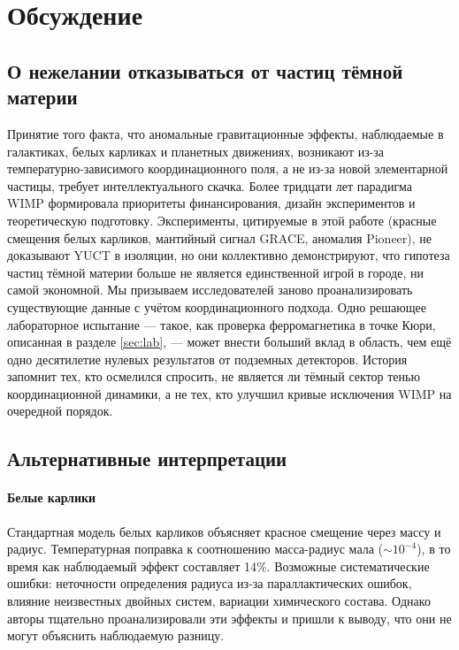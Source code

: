\documentclass[12pt]{article}
\theoremstyle{remark}
\begin{document}
	\section{Обсуждение}
	\label{sec:discussion}
	
	\subsection{О нежелании отказываться от частиц тёмной материи}
	\label{subsec:on-reluctance}
	
	Принятие того факта, что аномальные гравитационные эффекты, наблюдаемые в галактиках, белых карликах и планетных движениях, возникают из-за температурно-зависимого координационного поля, а не из-за новой элементарной частицы, требует интеллектуального скачка. Более тридцати лет парадигма WIMP формировала приоритеты финансирования, дизайн экспериментов и теоретическую подготовку. Эксперименты, цитируемые в этой работе (красные смещения белых карликов, мантийный сигнал GRACE, аномалия Pioneer), не доказывают YUCT в изоляции, но они коллективно демонстрируют, что гипотеза частиц тёмной материи больше не является единственной игрой в городе, ни самой экономной. Мы призываем исследователей заново проанализировать существующие данные с учётом координационного подхода. Одно решающее лабораторное испытание — такое, как проверка ферромагнетика в точке Кюри, описанная в разделе \ref{sec:lab}, — может внести больший вклад в область, чем ещё одно десятилетие нулевых результатов от подземных детекторов. История запомнит тех, кто осмелился спросить, не является ли тёмный сектор тенью координационной динамики, а не тех, кто улучшил кривые исключения WIMP на очередной порядок.
	
	\subsection{Альтернативные интерпретации}
	\label{subsec:discussion-alternatives}
	
	\paragraph{Белые карлики}
	Стандартная модель белых карликов объясняет красное смещение через массу и радиус. Температурная поправка к соотношению масса-радиус мала ($\sim 10^{-4}$), в то время как наблюдаемый эффект составляет 14\%. Возможные систематические ошибки: неточности определения радиуса из-за параллактических ошибок, влияние неизвестных двойных систем, вариации химического состава. Однако авторы \cite{Crumpler2024} тщательно проанализировали эти эффекты и пришли к выводу, что они не могут объяснить наблюдаемую разницу.
	
\end{document}
